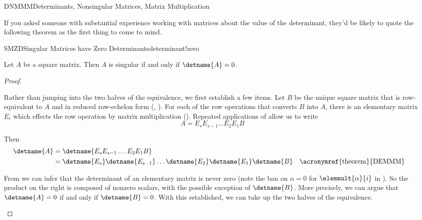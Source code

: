 %
\begin{subsect}{DNMMM}{Determinants, Nonsingular Matrices, Matrix Multiplication}
%
\begin{para}If you asked someone with substantial experience working with matrices about the value of the determinant, they'd be likely to quote the following theorem as the first thing to come to mind.\end{para}
%
\begin{theorem}{SMZD}{Singular Matrices have Zero Determinants}{determinant!zero}
\begin{para}Let $A$ be a square matrix.  Then $A$ is singular if and only if $\detname{A}=0$.\end{para}
\end{theorem}
%
\begin{proof}
\begin{para}Rather than jumping into the two halves of the equivalence, we first establish a few items.  Let $B$ be the unique square matrix that is row-equivalent to $A$ and in reduced row-echelon form (, ).  For each of the row operations that converts $B$ into $A$, there is an elementary matrix $E_i$ which effects the row operation by matrix multiplication ().  Repeated applications of  allow us to write
%
\begin{equation*}
A=E_sE_{s-1}\dots E_2E_1B
\end{equation*}
\end{para}
%
\begin{para}Then
%
\begin{align*}
\detname{A}
&=
\detname{E_sE_{s-1}\dots E_2E_1B}\\
%
&=\detname{E_s}\detname{E_{s-1}}\dots\detname{E_2}\detname{E_1}\detname{B}
&&\text{\acronymref{theorem}{DEMMM}}
%
\end{align*}
\end{para}
%
\begin{para}From  we can infer that the determinant of an elementary matrix is never zero (note the ban on $\alpha=0$ for $\elemmult{\alpha}{i}$ in ).  So the product on the right is composed of nonzero scalars, with the possible exception of $\detname{B}$.  More precisely, we can argue that $\detname{A}=0$ if and only if $\detname{B}=0$.  With this established, we can take up the two halves of the equivalence.\end{para}

\end{proof}
\end{subsect}
